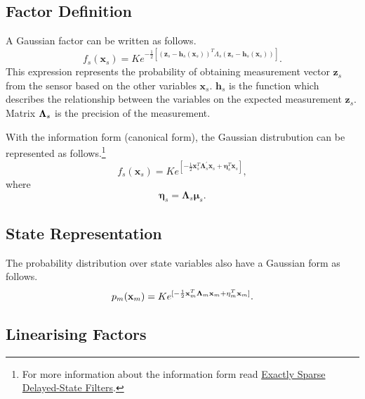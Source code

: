 \documentclass[twocolumn]{article}
\begin{document}
\subsection{Factor Definition}

A Gaussian factor can be written as follows.
\begin{equation}
    f_s(\textbf{x}_s) = Ke^{-\frac{1}{2}[(\textbf{z}_s - \textbf{h}_s(\textbf{x}_s))^T\Lambda_s(\textbf{z}_s - \textbf{h}_s(\textbf{x}_s))]}.
\end{equation}
This expression represents the probability of obtaining measurement vector $\textbf{z}_s$ from the sensor based on the other variables $\textbf{x}_s$. $\textbf{h}_s$ is the function which describes the relationship between the variables on the expected measurement $\textbf{z}_s$. Matrix ${\bf\Lambda}_s$ is the precision of the measurement.

With the information form (canonical form), the Gaussian distrubution can be represented as follows.\footnote{For more information about the information form read \href{http://citeseerx.ist.psu.edu/viewdoc/download?doi=10.1.1.140.3323&rep=rep1&type=pdf}{Exactly Sparse Delayed-State Filters}.}
\begin{equation}
    f_s(\textbf{x}_s) = Ke^{[-\frac{1}{2}\textbf{x}^T_s\boldsymbol{\Lambda}_s^{'}\textbf{x}_s + \boldsymbol{\eta}^T_s\textbf{x}_s]},
\end{equation}
where
\begin{equation}
    \boldsymbol{\eta}_s = \boldsymbol{\Lambda}_s \boldsymbol{\mu}_s.
\end{equation}

\subsection{State Representation}

The probability distribution over state variables also have a Gaussian form as follows.
\begin{equation}
    p_m(\textbf{x}_m) = Ke^{[-\frac{1}{2}\textbf{x}^T_m{\bf\Lambda}_m\textbf{x}_m + {\bf\eta}^T_m\textbf{x}_m]}.
\end{equation}

\subsection{Linearising Factors}
\end{document}
